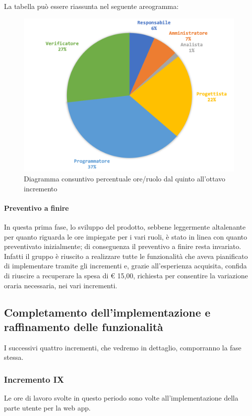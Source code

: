 		\pagebreak
		
		La tabella può essere riassunta nel seguente areogramma:
		\begin{figure}[H]
			\centering
			\includegraphics[width=0.8\linewidth]{./images/consuntivo/ConsIncr5-8-2.png}
			\caption{Diagramma consuntivo percentuale ore/ruolo dal quinto all'ottavo incremento}
			\label{fig:diagramma consuntivo costi ruolo incrementi V-VIII}
		\end{figure}
		
		\paragraph{Preventivo a finire}
		In questa prima fase, lo sviluppo del prodotto, sebbene leggermente altalenante per quanto riguarda le ore impiegate per i vari ruoli, è stato in linea con quanto preventivato inizialmente; di conseguenza il preventivo a finire resta invariato.
		\newline
		Infatti il gruppo è riuscito a realizzare tutte le funzionalità che aveva pianificato di implementare tramite gli incrementi e, grazie all'esperienza acquisita, confida di riuscire a recuperare la spesa di € 15,00, richiesta per consentire la variazione oraria necessaria, nei vari incrementi.
		
		\subsection{Completamento dell'implementazione e raffinamento delle funzionalità}
		I successivi quattro incrementi, che vedremo in dettaglio, comporranno la fase stessa.  		
		
		\pagebreak
		
		\subsubsection{Incremento IX}
			Le ore di lavoro svolte in questo periodo sono volte all'implementazione della parte utente per la web app.
